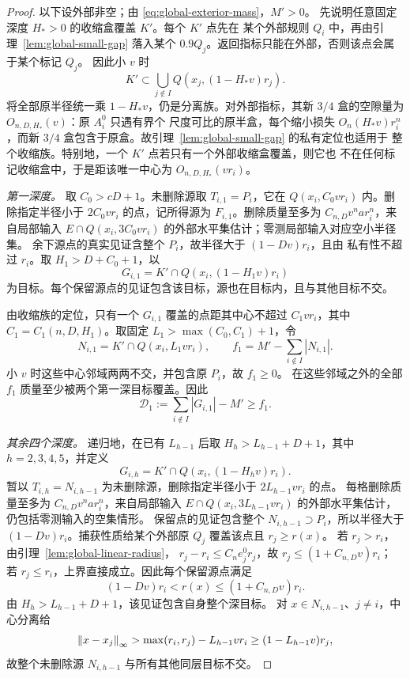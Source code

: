 \begin{proof}
以下设外部非空；由 \eqref{eq:global-exterior-mass}，\(M'>0\)。
先说明任意固定深度 \(H_*>0\) 的收缩盒覆盖 \(K'\)。每个 \(K'\) 点先在
某个外部规则 \(Q_i\) 中，再由引理~\ref{lem:global-small-gap} 落入某个
\(0.9Q_j\)。返回指标只能在外部，否则该点会属于某个标记 \(Q_j\)。
因此小 \(v\) 时
\begin{equation}\label{eq:global-deep-exterior-cover}
 K'\subset\bigcup_{j\notin I}Q(x_j,(1-H_*v)r_j).
\end{equation}
将全部原半径统一乘 \(1-H_*v\)，仍是分离族。对外部指标，其新
\(3/4\) 盒的空隙量为 \(O_{n,D,H_*}(v)\)：原 \(A_i^0\) 只遇有界个
尺度可比的原半盒，每个缩小损失 \(O_n(H_*v)r_i^n\)，而新
\(3/4\) 盒包含于原盒。故引理~\ref{lem:global-small-gap} 的私有定位也适用于
整个收缩族。特别地，一个 \(K'\) 点若只有一个外部收缩盒覆盖，则它也
不在任何标记收缩盒中，于是距该唯一中心为 \(O_{n,D,H_*}(vr_i)\)。

\emph{第一深度。}
取 \(C_0>cD+1\)。未删除源取 \(T_{i,1}=P_i\)，它在 \(Q(x_i,C_0vr_i)\) 内。删除指定半径小于
\(2C_0vr_i\) 的点，记所得源为 \(F_{i,1}\)。删除质量至多为
\(C_{n,D}v^n ar_i^n\)，来自局部输入
\(E\cap Q(x_i,3C_0vr_i)\) 的外部水平集估计；零测局部输入对应空小半径集。
余下源点的真实见证含整个 \(P_i\)，故半径大于 \((1-Dv)r_i\)，且由
私有性不超过 \(r_i\)。取 \(H_1>D+C_0+1\)，以
\[
 G_{i,1}=K'\cap Q(x_i,(1-H_1v)r_i)
\]
为目标。每个保留源点的见证包含该目标，源也在目标内，且与其他目标不交。

由收缩族的定位，只有一个 \(G_{i,1}\) 覆盖的点距其中心不超过
\(C_{1}vr_i\)，其中 \(C_{1}=C_{1}(n,D,H_1)\)。取固定
\(L_1>\max(C_0,C_{1})+1\)，令
\[
 N_{i,1}=K'\cap Q(x_i,L_1vr_i),\qquad
 f_1=M'-\sum_{i\notin I}|N_{i,1}|.
\]
小 \(v\) 时这些中心邻域两两不交，并包含原 \(P_i\)，故 \(f_1\ge0\)。
在这些邻域之外的全部 \(f_1\) 质量至少被两个第一深目标覆盖。因此
\begin{equation}\label{eq:global-first-duplicate}
 \mathcal D_1:=\sum_{i\notin I}|G_{i,1}|-M'\ge f_1.
\end{equation}

\emph{其余四个深度。}
递归地，在已有 \(L_{h-1}\) 后取
\(H_h>L_{h-1}+D+1\)，其中 \(h=2,3,4,5\)，并定义
\[
 G_{i,h}=K'\cap Q(x_i,(1-H_hv)r_i).
\]
暂以 \(T_{i,h}=N_{i,h-1}\) 为未删除源，删除指定半径小于 \(2L_{h-1}vr_i\) 的点。
每格删除质量至多为 \(C_{n,D}v^n ar_i^n\)，来自局部输入
\(E\cap Q(x_i,3L_{h-1}vr_i)\) 的外部水平集估计，仍包括零测输入的空集情形。
保留点的见证包含整个 \(N_{i,h-1}\supset P_i\)，所以半径大于
\((1-Dv)r_i\)。捕获性质给某个外部原 \(Q_j\) 覆盖该点且 \(r_j\ge r(x)\)。
若 \(r_j>r_i\)，由引理~\ref{lem:global-linear-radius}，
\(r_j-r_i\le C_ne_j^0r_j\)，故 \(r_j\le(1+C_{n,D}v)r_i\)；
若 \(r_j\le r_i\)，上界直接成立。因此每个保留源点满足
\[
 (1-Dv)r_i<r(x)\le(1+C_{n,D}v)r_i.
\]
由 \(H_h>L_{h-1}+D+1\)，该见证包含自身整个深目标。
对 \(x\in N_{i,h-1}\)、\(j\ne i\)，中心分离给
\[
 \left\lVert x-x_j\right\rVert_\infty>
 \max(r_i,r_j)-L_{h-1}vr_i\ge(1-L_{h-1}v)r_j,
\]
故整个未删除源 \(N_{i,h-1}\) 与所有其他同层目标不交。


\end{proof}
